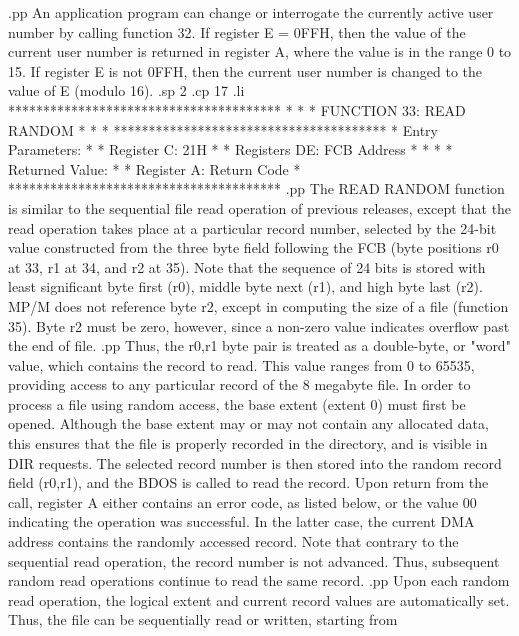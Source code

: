 .pp
An application program can change or interrogate
the currently active user
number by calling function 32.  If register E = 0FFH, then
the value of the current user number is returned in register A,
where the value is in the range 0 to 15.  If register E is not
0FFH, then the current user number is changed to the value of
E (modulo 16).
.sp 2
.cp 17
.li
***************************************
*                                     *
*  FUNCTION 33: READ RANDOM           *
*                                     *
***************************************
*  Entry Parameters:                  *
*      Register   C:  21H             *
*      Registers DE:  FCB Address     *
*                                     *
*  Returned   Value:                  *
*      Register   A:  Return Code     *
***************************************
.pp
The READ RANDOM function is similar to the sequential file
read operation of previous releases, except that the read
operation takes place at a particular record number, selected
by the 24-bit value constructed from the three byte field
following the FCB (byte positions r0 at 33, r1 at 34, and
r2 at 35).  Note that the sequence of 24 bits is stored
with least significant byte first (r0), middle byte
next (r1), and high byte last (r2).  MP/M
does not reference byte r2, except in computing the size
of a file (function 35).  Byte r2 must be zero, however,
since a non-zero value indicates overflow past the end
of file.
.pp
Thus, the r0,r1 byte pair is treated
as a double-byte, or "word" value, which contains the
record to read.  This value ranges from 0 to 65535, providing
access to any particular record of the 8 megabyte file.
In order to process a file using random access, the base
extent (extent 0) must first be opened.  Although the base
extent may or may not contain any allocated data, this
ensures that the file is properly recorded in the directory,
and is visible in DIR requests.  The selected record number
is then stored into the random record field (r0,r1), and
the BDOS is called to read the record.  Upon return from
the call, register A either contains an error code, as
listed below, or the value 00 indicating the operation
was successful.  In the latter case, the current DMA
address contains the randomly accessed record.  Note that
contrary to the sequential read operation, the record
number is not advanced.  Thus, subsequent random read
operations continue to read the same record.
.pp
Upon each random read operation, the logical extent and current
record values are automatically set.
Thus, the file can be sequentially read or written, starting from
